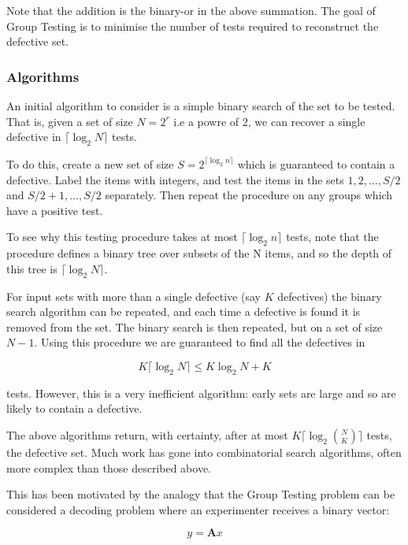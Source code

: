 Note that the addition is the binary-or in the above summation. The goal of Group Testing is to minimise the number of tests required to reconstruct the defective set.

\subsubsection*{Algorithms}
An initial algorithm to consider is a simple binary search of the set to be tested. That is, given a set of size \(N = 2^r\) i.e a powre of 2, we can recover a single defective in
\(\lceil{\log_2{N}}\rceil\) tests.

To do this, create a new set of size \(S = 2^{\lceil{\log_2{n}}\rceil}\) which is guaranteed to contain a defective. Label the items with integers, and test the items in the sets \({1,2,\ldots ,S/2}\) and \({S/2 + 1,\ldots ,S/2}\) separately. Then repeat the procedure on any groups which have a positive test. 

To see why this testing procedure takes at most \(\lceil{\log_2{n}}\rceil\) tests, note that the procedure defines a binary tree over subsets of the N items, and so the depth of this tree is \(\lceil{\log_2{N}}\rceil\).

For input sets with more than a single defective (say \(K\) defectives) the binary search algorithm can be repeated, and each time a defective is found it is removed from the set. The binary search is then repeated, but on a set of size \(N-1\). Using this procedure we are guaranteed to find all the defectives in 

\begin{equation}
K \lceil \log_2{N} \rceil \leq K\log_2{N} + K
\end{equation}

tests. However, this is a very inefficient algorithm: early sets are large and so are likely to contain a defective.

The above algorithms return, with certainty, after at most \(K\lceil \log_2{N\choose K}\rceil\) tests, the defective set. Much work has gone into combinatorial search algorithms, often more complex than those described above. 

This has been motivated by the analogy that the Group Testing problem can be considered a decoding problem where an experimenter receives a binary vector: 

\begin{equation}
y = \textbf{A}x
\end{equation}

